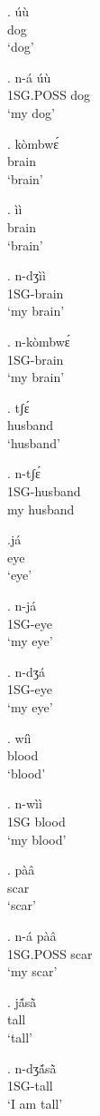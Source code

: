 \documentclass{assets/fieldnotes}
\begin{document}
\exg. úù\\
dog\\
`dog'

\exg. n-á úù\\
1SG.POSS dog\\
`my dog'

\exg. kòmbwɛ́\\
brain\\
`brain'

\exg. ìì\\
brain\\
`brain'

\exg. n-dʒìì\\
1SG-brain\\
`my brain'

 \exg. n-kòmbwɛ́\\
1SG-brain\\
`my brain'

\exg. tʃɛ́\\
husband\\
`husband'

\exg. n-tʃɛ́\\
1SG-husband\\
my husband

\exg.já\\
eye\\
`eye'

\exg. n-já\\
1SG-eye\\
`my eye'

\exg. n-dʒá\\
1SG-eye\\
`my eye'

\exg. wíì\\
blood\\
`blood'

\exg. n-wìì\\
1SG blood\\
`my blood'


\exg. pàâ\\
scar\\
`scar'

\exg. n-á pàâ\\
1SG.POSS scar\\
`my scar'

\exg. jã́sã̀\\
tall\\
`tall'

\exg. n-dʒã́sã̀\\
1SG-tall\\
`I am tall' 
\end{document}
